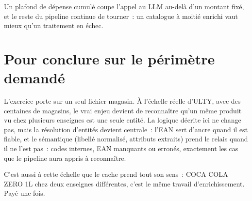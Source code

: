 \documentclass[11pt,a4paper]{article}
\begin{document}
Un plafond de dépense cumulé coupe l'appel au LLM au-delà d'un montant fixé, et le reste du
pipeline continue de tourner~: un catalogue à moitié enrichi vaut mieux qu'un traitement en échec.

\section*{Pour conclure sur le périmètre demandé}

L'exercice porte sur un seul fichier magasin. À l'échelle réelle d'ULTY, avec des
centaines de magasins, le vrai enjeu devient de reconnaître qu'un même produit vu chez plusieurs
enseignes est une seule entité. La logique décrite ici ne change pas, mais la résolution d'entités
devient centrale~: l'EAN sert d'ancre quand il est fiable, et le sémantique (libellé normalisé,
attributs extraits) prend le relais quand il ne l'est pas~: codes internes, EAN manquants ou
erronés, exactement les cas que le pipeline aura appris à reconnaître.

C'est aussi à cette échelle que le cache prend tout son sens~: \guillemotleft{} COCA COLA ZERO 1L \guillemotright{} chez deux
enseignes différentes, c'est le même travail d'enrichissement. Payé une fois.

\vspace{0.5em}
\end{document}
